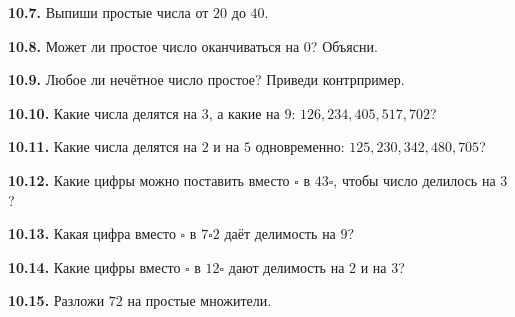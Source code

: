 \noindent\begin{minipage}[t]{\linewidth}\textbf{10.7.} Выпиши простые числа от \(20\) до \(40\).\par\end{minipage}\par
\noindent\begin{minipage}[t]{\linewidth}\textbf{10.8.} Может ли простое число оканчиваться на \(0\)? Объясни.\par\end{minipage}\par
\noindent\begin{minipage}[t]{\linewidth}\textbf{10.9.} Любое ли нечётное число простое? Приведи контрпример.\par\end{minipage}\par
\noindent\begin{minipage}[t]{\linewidth}\textbf{10.10.} Какие числа делятся на \(3\), а какие на \(9\): \(126,\allowbreak 234,\allowbreak 405,\allowbreak 517,\allowbreak 702\)?\par\end{minipage}\par
\noindent\begin{minipage}[t]{\linewidth}\textbf{10.11.} Какие числа делятся на \(2\) и на \(5\) одновременно: \(125,\allowbreak 230,\allowbreak 342,\allowbreak 480,\allowbreak 705\)?\par\end{minipage}\par
\noindent\begin{minipage}[t]{\linewidth}\textbf{10.12.} Какие цифры можно поставить вместо \(\square \) в \(43 \square \), чтобы число делилось на \(3\)?\par\end{minipage}\par
\noindent\begin{minipage}[t]{\linewidth}\textbf{10.13.} Какая цифра вместо \(\square \) в \(7 \square  2\) даёт делимость на \(9\)?\par\end{minipage}\par
\noindent\begin{minipage}[t]{\linewidth}\textbf{10.14.} Какие цифры вместо \(\square \) в \(12 \square \) дают делимость на \(2\) и на \(3\)?\par\end{minipage}\par
\noindent\begin{minipage}[t]{\linewidth}\textbf{10.15.} Разложи \(72\) на простые множители.\par\end{minipage}\par

